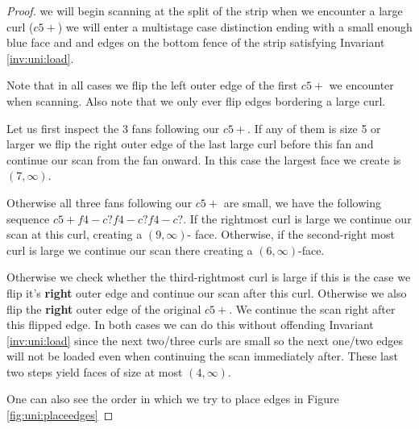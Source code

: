 \begin{proof}
  we will begin scanning at the split of the strip when we encounter a large curl ($c5+$) we  will enter a multistage case distinction ending with a small enough blue face and and edges on the bottom fence of the strip satisfying Invariant \ref{inv:uni:load}.

  Note that in all cases we flip the left outer edge of the first $c5+$ we encounter when scanning. Also note that we only ever flip edges bordering a large curl.


  Let us first inspect the 3 fans following our $c5+$. If any of them is size 5 or larger we flip the right outer edge of the last large curl before this fan and continue our scan from the fan onward. In this case the largest face we create is $(7, \infty)$.

  Otherwise all three fans following our $c5+$ are small, we have the following sequence $c5+ f4- c? f4- c? f4- c?$. If the rightmost curl is large we continue our scan at this curl, creating a $(9, \infty)$- face. Otherwise, if the second-right most curl is large we continue our scan there creating a $(6, \infty)$-face.

  Otherwise we check whether the third-rightmost curl is large if this is the case we flip it's \textbf{right} outer edge and continue our scan after this curl. Otherwise we also flip the \textbf{right} outer edge of the original $c5+$. We continue the scan right after this flipped edge. In both cases we can do this without offending Invariant \ref{inv:uni:load} since the next two/three curls are small so the next one/two edges will not be loaded even when continuing the scan immediately after. These last two steps yield faces of size at most $(4, \infty)$.

  One can also see the order in which we try to place edges in Figure \ref{fig:uni:placeedges}


\end{proof}

